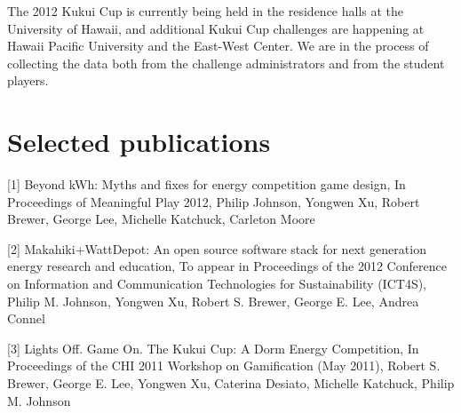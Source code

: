 \documentclass[11pt]{article}
\begin{document}
 The 2012 Kukui Cup is currently being held in the residence halls at the University of Hawaii, and additional Kukui Cup challenges are happening at Hawaii Pacific University and the East-West Center. We are in the process of collecting the data both from the challenge administrators and from the student players.

\section{Selected publications}

[1] Beyond kWh: Myths and fixes for energy competition game design, In Proceedings of Meaningful Play 2012, Philip Johnson, Yongwen Xu, Robert Brewer, George Lee, Michelle Katchuck, Carleton Moore

[2] Makahiki+WattDepot: An open source software stack for next generation energy research and education, To appear in Proceedings of the 2012 Conference on Information and Communication Technologies for Sustainability (ICT4S), Philip M. Johnson, Yongwen Xu, Robert S. Brewer, George E. Lee, Andrea Connel

[3] Lights Off. Game On. The Kukui Cup: A Dorm Energy Competition,  In Proceedings of the CHI 2011 Workshop on Gamification (May 2011), Robert S. Brewer, George E. Lee, Yongwen Xu, Caterina Desiato, Michelle Katchuck, Philip M. Johnson

\end{document}

